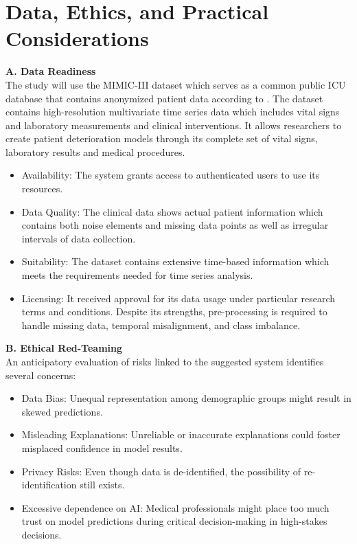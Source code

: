 \documentclass[conference]{IEEEtran}
\begin{document}
\section{Data, Ethics, and Practical Considerations}

\textbf{A. Data Readiness}\\

The study will use the MIMIC-III dataset which serves as a common public ICU database that contains anonymized patient data according to  \cite{johnson2016mimic}. The dataset contains high-resolution multivariate time series data which includes vital signs and laboratory measurements and clinical interventions. It allows researchers to create patient deterioration models through its complete set of vital signs, laboratory results and medical procedures. 
\begin{itemize}
    \item Availability: The system grants access to authenticated users to use its resources. 
    \item Data Quality: The clinical data shows actual patient information which contains both noise elements and missing data points as well as irregular intervals of data collection. 
    \item Suitability: The dataset contains extensive time-based information which meets the requirements needed for time series analysis. 
    \item Licensing: It received approval for its data usage under particular research terms and conditions. 
Despite its strengths, pre-processing is required to handle missing data, temporal misalignment, and class imbalance.
\end{itemize}

\vspace{0.3cm}

\textbf{B.  Ethical Red-Teaming}\\

An anticipatory evaluation of risks linked to the suggested system identifies several concerns:
\begin{itemize}
    \item Data Bias: Unequal representation among demographic groups might result in skewed predictions.
    \item Misleading Explanations: Unreliable or inaccurate explanations could foster misplaced confidence in model results.
    \item Privacy Risks: Even though data is de-identified, the possibility of re-identification still exists.
    \item Excessive dependence on AI: Medical professionals might place too much trust on model predictions during critical decision-making in high-stakes decisions.
\end{itemize}
\end{document}
